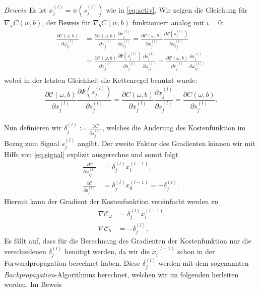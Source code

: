 $Beweis$ Es ist $x_j^{(l)}=\psi(s_j^{(l)})$ wie in \eqref{eq:activ}. Wir zeigen die Gleichung für
$\nabla_{\omega}C(w,b)$, der Beweis für  $\nabla_{b}C(w,b)$ funktioniert analog mit $i=0$:
\begin{align*}
    \frac{\partial \mathcal{C}(\omega,b)}{\partial \omega_{ij}^{(l)}} &= \frac{\partial \mathcal{C}(\omega,b)}{\partial x_j^{(l)}} \frac{\partial x_j^{(l)}}{\partial \omega_{ij}^{(l)}}
    = \frac{\partial \mathcal{C}(\omega,b)}{\partial x_j^{(l)}} \frac{\partial \Psi(s_j^{(l)})}{\partial \omega_{ij}^{(l)}} \\
    &=\frac{\partial \mathcal{C}(\omega,b)}{\partial x_j^{(l)}} \frac{\partial \Psi(s_j^{(l)})}{\partial s_j^{(l)}} \frac{\partial s_j^{(l)}}{\partial \omega_{ij}^{(l)}}
    = \frac{\partial \mathcal{C}(\omega,b)}{\partial s_{j}^{(l)}} \frac{\partial s_{j}^{(l)}}{\partial \omega_{ij}^{(l)}}, \\
\end{align*}
wobei in der letzten Gleichheit die Kettenregel benutzt wurde:
\[
    \frac{\partial \mathcal{C}(\omega,b)}{\partial x_j^{(l)}} \frac{\partial \Psi(s_j^{(l)})}{\partial s_j^{(l)}}
    = \frac{\partial C(\omega,b)}{\partial x_j^{(l)}} \frac{\partial x_j^{(l)}}{\partial s_j^{(l)}}
    = \frac{\partial C(\omega,b)}{\partial s_j^{(l)}}.
\]
\qedwhite\\
Nun definieren wir $\delta_j^{(l)}:=\frac{\partial C}{\partial s_{j}^{(l)}}$, welches die Änderung des Kostenfunktion im Bezug zum Signal
$s_j^{(l)}$ angibt. Der zweite Faktor des Gradienten können wir mit Hilfe von \eqref{eq:signal} explizit ausgerechne und
somit folgt
\begin{align*}
    \frac{\partial \mathcal{C}}{\partial \omega_{ij}^{(l)}} &= \delta_j^{(l)} x_i^{(l-1)}, \\
    \frac{\partial \mathcal{C}}{\partial b_j^{(l)}} &= \delta_j^{(l)} x_{0}^{(l-1)} = -\delta_j^{(l)}.
\end{align*}
Hiermit kann der Gradient der Kostenfunktion vereinfacht werden zu
\begin{align*}
    \nabla \mathcal{C}_{\omega}&=\delta_j^{(l)}x_i^{(l-1)} \\
    \nabla \mathcal{C}_{b}&=-\delta_j^{(l)}.
\end{align*}
Es fällt auf, dass für die Berechnung des Gradienten der Kostenfunktion nur die verschiedenen $\delta_j^{(l)}$ benötigt
werden, da wir die $x_i^{(l-1)}$ schon in der Forwardpropagation berechnet haben. Diese $\delta_j^{(l)}$ werden mit dem
sogenannten \textit{Backpropagation}-Algorithmus berechnet, welchen wir im folgenden herleiten werden. Im Beweis
